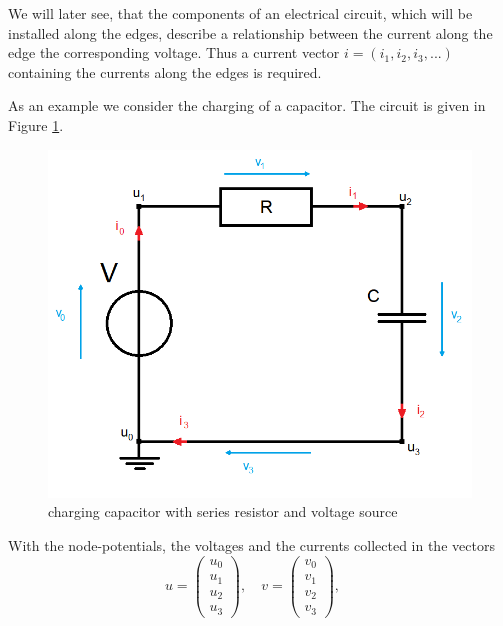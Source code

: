We will later see, that the components of an electrical circuit, which will be installed along the edges, describe a relationship between the current along the edge the corresponding voltage. Thus a current vector $i = (i_1, i_2, i_3, ...)$ containing the currents along the edges is required.


\begin{example}
	\label{ex:network topology}
	As an example we consider the charging of a capacitor. The circuit is given in Figure \ref{circuit:charging of capacitor}.
	\begin{figure}[H]
		\centering
		\includegraphics[scale=0.5]{pictures/Example1_simple.png}
		\caption{charging capacitor with series resistor and voltage source}
		\label{circuit:charging of capacitor}
	\end{figure}
	With the node-potentials, the voltages and the currents collected in the vectors
	\begin{displaymath}
		u=
		\left(
		\begin{matrix}
			u_0 \\
			u_1 \\
			u_2 \\
			u_3 
		\end{matrix}
		\right),
		\quad
		v=
		\left(
		\begin{matrix}
			v_0 \\
			v_1 \\
			v_2 \\
			v_3 
		\end{matrix}
		\right),
		\quad

\end{displaymath}
\end{example}
